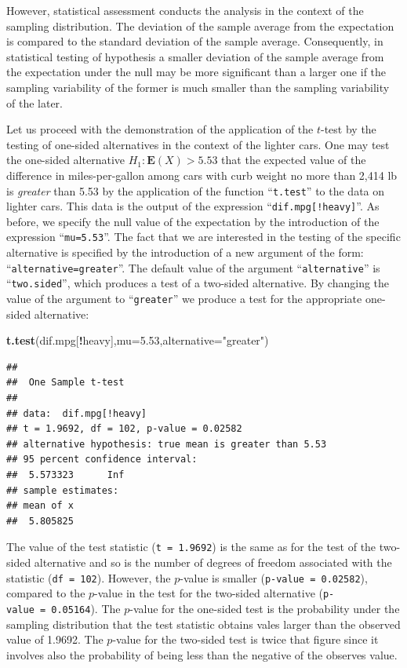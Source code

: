 \documentclass[
]{krantz}
\makeatletter
\newenvironment{Shaded}{\begin{snugshade}}{\end{snugshade}}
\newcommand{\DataTypeTok}[1]{\textcolor[rgb]{0.13,0.29,0.53}{#1}}
\newcommand{\FloatTok}[1]{\textcolor[rgb]{0.00,0.00,0.81}{#1}}
\newcommand{\KeywordTok}[1]{\textcolor[rgb]{0.13,0.29,0.53}{\textbf{#1}}}
\newcommand{\NormalTok}[1]{#1}
\newcommand{\OperatorTok}[1]{\textcolor[rgb]{0.81,0.36,0.00}{\textbf{#1}}}
\newcommand{\StringTok}[1]{\textcolor[rgb]{0.31,0.60,0.02}{#1}}
\newcommand{\Expec}{\mathbf{E}}
\newenvironment{kframe}{%
\medskip{}
\setlength{\fboxsep}{.8em}
 \def\at@end@of@kframe{}%
 \ifinner\ifhmode%
  \def\at@end@of@kframe{\end{minipage}}%
  \begin{minipage}{\columnwidth}%
 \fi\fi%
 \def\FrameCommand##1{\hskip\@totalleftmargin \hskip-\fboxsep
 \colorbox{shadecolor}{##1}\hskip-\fboxsep
     \hskip-\linewidth \hskip-\@totalleftmargin \hskip\columnwidth}%
 \MakeFramed {\advance\hsize-\width
   \@totalleftmargin\z@ \linewidth\hsize
   \@setminipage}}%
 {\par\unskip\endMakeFramed%
 \at@end@of@kframe}
\renewenvironment{Shaded}{\begin{kframe}}{\end{kframe}}
\theoremstyle{definition}
\theoremstyle{definition}
\theoremstyle{definition}
\theoremstyle{remark}
\makeatother
\begin{document}
However, statistical assessment conducts the analysis in the context of
the sampling distribution. The deviation of the sample average from the
expectation is compared to the standard deviation of the sample average.
Consequently, in statistical testing of hypothesis a smaller deviation
of the sample average from the expectation under the null may be more
significant than a larger one if the sampling variability of the former
is much smaller than the sampling variability of the later.

Let us proceed with the demonstration of the application of the \(t\)-test
by the testing of one-sided alternatives in the context of the lighter
cars. One may test the one-sided alternative \(H_1:\Expec(X) > 5.53\) that
the expected value of the difference in miles-per-gallon among cars with
curb weight no more than 2,414 lb is \emph{greater} than 5.53 by the
application of the function ``\texttt{t.test}'' to the data on lighter cars. This
data is the output of the expression ``\texttt{dif.mpg{[}!heavy{]}}''. As before, we
specify the null value of the expectation by the introduction of the
expression ``\texttt{mu=5.53}''. The fact that we are interested in the testing
of the specific alternative is specified by the introduction of a new
argument of the form: ``\texttt{alternative=greater}''. The default value of the
argument ``\texttt{alternative}'' is ``\texttt{two.sided}'', which produces a test of a
two-sided alternative. By changing the value of the argument to
``\texttt{greater}'' we produce a test for the appropriate one-sided alternative:

\begin{Shaded}
\begin{Highlighting}[]
\KeywordTok{t.test}\NormalTok{(dif.mpg[}\OperatorTok{!}\NormalTok{heavy],}\DataTypeTok{mu=}\FloatTok{5.53}\NormalTok{,}\DataTypeTok{alternative=}\StringTok{"greater"}\NormalTok{)}
\end{Highlighting}
\end{Shaded}

\begin{verbatim}
## 
##  One Sample t-test
## 
## data:  dif.mpg[!heavy]
## t = 1.9692, df = 102, p-value = 0.02582
## alternative hypothesis: true mean is greater than 5.53
## 95 percent confidence interval:
##  5.573323      Inf
## sample estimates:
## mean of x 
##  5.805825
\end{verbatim}

The value of the test statistic (\texttt{t\ =\ 1.9692}) is the same as for the
test of the two-sided alternative and so is the number of degrees of
freedom associated with the statistic (\texttt{df\ =\ 102}). However, the
\(p\)-value is smaller (\texttt{p-value\ =\ 0.02582}), compared to the \(p\)-value in
the test for the two-sided alternative (\texttt{p-value\ =\ 0.05164}). The
\(p\)-value for the one-sided test is the probability under the sampling
distribution that the test statistic obtains vales larger than the
observed value of 1.9692. The \(p\)-value for the two-sided test is twice
that figure since it involves also the probability of being less than
the negative of the observes value.
\end{document}
